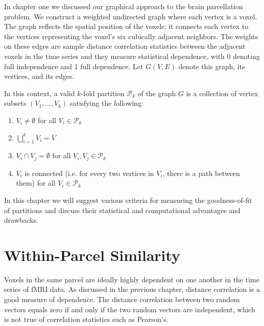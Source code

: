 
In chapter one we discussed our graphical approach to the brain
parcellation problem. We construct a weighted undirected graph where
each vertex is a voxel. The graph reflects the spatial position of the
voxels; it connects each vertex to the vertices representing the voxel's
six cubically adjacent neighbors. The weights on these edges are sample
distance correlation statistics between the adjacent voxels in
the time series and they measure statistical dependence, with 0 denoting full independence and 1 full dependence. Let $G(V, E)$ denote
this graph, its vertices, and its edges.

In this context, a valid $k$-fold partition $\mathcal{P}_k$ of the
graph $G$ is a collection of vertex subsets $(V_1, ..., V_k)$
satisfying the following:

\begin{enumerate}[1.]
\item
$V_i \neq \emptyset$ for all $V_i \in \mathcal{P}_k$

\item
$\bigcup\limits_{i=1}^k V_i = V$

\item
$V_i \cap V_j = \emptyset$ for all $V_i, V_j \in \mathcal{P}_k$

\item
$V_i$ is connected (i.e. for every two vertices in $V_i$, there is a
path between them) for all $V_i \in \mathcal{P}_k$
\end{enumerate}

In this chapter we will suggest various criteria for measuring the
goodness-of-fit of partitions and discuss their statistical and
computational advantages and drawbacks.


\section{Within-Parcel Similarity}

Voxels in the same parcel are ideally highly dependent on one another in
the time series of fMRI data. As discussed in the previous chapter,
distance correlation is a good measure of dependence. The distance
correlation between two random vectors equals zero if and only if the
two random vectors are independent, which is not true of correlation
statistics such as Pearson's.

